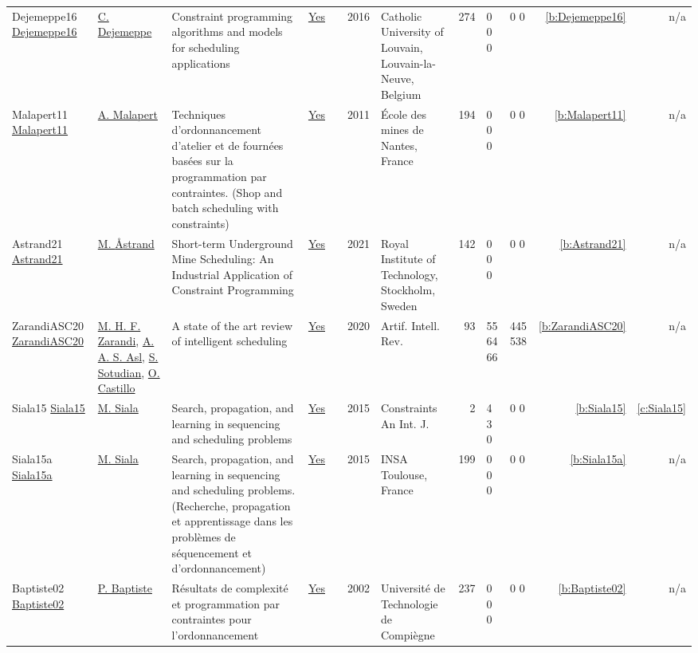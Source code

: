 {\begin{longtable}{>{\raggedright\arraybackslash}p{3cm}>{\raggedright\arraybackslash}p{4.5cm}>{\raggedright\arraybackslash}p{6.0cm}rrrp{2.5cm}rp{1cm}p{1cm}rr}
Dejemeppe16 \href{https://hdl.handle.net/2078.1/178078}{Dejemeppe16} & \hyperref[auth:a202]{C. Dejemeppe} & Constraint programming algorithms and models for scheduling applications & \href{../works/Dejemeppe16.pdf}{Yes} & \cite{Dejemeppe16} & 2016 & Catholic University of Louvain, Louvain-la-Neuve, Belgium & 274 & 0 0 0 & 0 0 & \ref{b:Dejemeppe16} & n/a\\
Malapert11 \href{https://tel.archives-ouvertes.fr/tel-00630122}{Malapert11} & \hyperref[auth:a82]{A. Malapert} & Techniques d'ordonnancement d'atelier et de fourn{\'{e}}es bas{\'{e}}es sur la programmation par contraintes. (Shop and batch scheduling with constraints) & \href{../works/Malapert11.pdf}{Yes} & \cite{Malapert11} & 2011 & {\'{E}}cole des mines de Nantes, France & 194 & 0 0 0 & 0 0 & \ref{b:Malapert11} & n/a\\
Astrand21 \href{https://nbn-resolving.org/urn:nbn:se:kth:diva-294959}{Astrand21} & \hyperref[auth:a74]{M. {\AA}strand} & Short-term Underground Mine Scheduling: An Industrial Application of Constraint Programming & \href{../works/Astrand21.pdf}{Yes} & \cite{Astrand21} & 2021 & Royal Institute of Technology, Stockholm, Sweden & 142 & 0 0 0 & 0 0 & \ref{b:Astrand21} & n/a\\
ZarandiASC20 \href{https://doi.org/10.1007/s10462-018-9667-6}{ZarandiASC20} & \hyperref[auth:a829]{M. H. F. Zarandi}, \hyperref[auth:a830]{A. A. S. Asl}, \hyperref[auth:a831]{S. Sotudian}, \hyperref[auth:a832]{O. Castillo} & A state of the art review of intelligent scheduling & \href{../works/ZarandiASC20.pdf}{Yes} & \cite{ZarandiASC20} & 2020 & Artif. Intell. Rev. & 93 & 55 64 66 & 445 538 & \ref{b:ZarandiASC20} & n/a\\
Siala15 \href{https://doi.org/10.1007/s10601-015-9213-y}{Siala15} & \hyperref[auth:a129]{M. Siala} & Search, propagation, and learning in sequencing and scheduling problems & \href{../works/Siala15.pdf}{Yes} & \cite{Siala15} & 2015 & Constraints An Int. J. & 2 & 4 3 0 & 0 0 & \ref{b:Siala15} & \ref{c:Siala15}\\
Siala15a \href{https://tel.archives-ouvertes.fr/tel-01164291}{Siala15a} & \hyperref[auth:a129]{M. Siala} & Search, propagation, and learning in sequencing and scheduling problems. (Recherche, propagation et apprentissage dans les probl{\`{e}}mes de s{\'{e}}quencement et d'ordonnancement) & \href{../works/Siala15a.pdf}{Yes} & \cite{Siala15a} & 2015 & {INSA} Toulouse, France & 199 & 0 0 0 & 0 0 & \ref{b:Siala15a} & n/a\\
Baptiste02 \href{https://theses.hal.science/tel-00124998}{Baptiste02} & \hyperref[auth:a162]{P. Baptiste} & {R{\'e}sultats de complexit{\'e} et programmation par contraintes pour l'ordonnancement} & \href{../works/Baptiste02.pdf}{Yes} & \cite{Baptiste02} & 2002 & {Universit{\'e} de Technologie de Compi{\`e}gne} & 237 & 0 0 0 & 0 0 & \ref{b:Baptiste02} & n/a\\

\end{longtable}}
